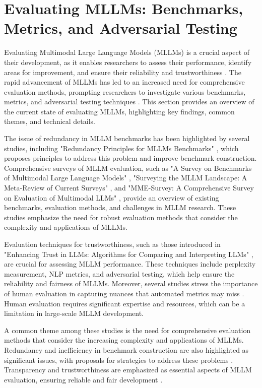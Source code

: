 \documentclass[conference]{IEEEtran}
\begin{document}
\section{Evaluating MLLMs: Benchmarks, Metrics, and Adversarial Testing}
Evaluating Multimodal Large Language Models (MLLMs) is a crucial aspect of their development, as it enables researchers to assess their performance, identify areas for improvement, and ensure their reliability and trustworthiness \cite{b1}. The rapid advancement of MLLMs has led to an increased need for comprehensive evaluation methods, prompting researchers to investigate various benchmarks, metrics, and adversarial testing techniques \cite{b2}. This section provides an overview of the current state of evaluating MLLMs, highlighting key findings, common themes, and technical details.

The issue of redundancy in MLLM benchmarks has been highlighted by several studies, including "Redundancy Principles for MLLMs Benchmarks" \cite{b3}, which proposes principles to address this problem and improve benchmark construction. Comprehensive surveys of MLLM evaluation, such as "A Survey on Benchmarks of Multimodal Large Language Models" \cite{b4}, "Surveying the MLLM Landscape: A Meta-Review of Current Surveys" \cite{b5}, and "MME-Survey: A Comprehensive Survey on Evaluation of Multimodal LLMs" \cite{b6}, provide an overview of existing benchmarks, evaluation methods, and challenges in MLLM research. These studies emphasize the need for robust evaluation methods that consider the complexity and applications of MLLMs.

Evaluation techniques for trustworthiness, such as those introduced in "Enhancing Trust in LLMs: Algorithms for Comparing and Interpreting LLMs" \cite{b7}, are crucial for assessing MLLM performance. These techniques include perplexity measurement, NLP metrics, and adversarial testing, which help ensure the reliability and fairness of MLLMs. Moreover, several studies stress the importance of human evaluation in capturing nuances that automated metrics may miss \cite{b8}. Human evaluation requires significant expertise and resources, which can be a limitation in large-scale MLLM development.

A common theme among these studies is the need for comprehensive evaluation methods that consider the increasing complexity and applications of MLLMs. Redundancy and inefficiency in benchmark construction are also highlighted as significant issues, with proposals for strategies to address these problems \cite{b3}. Transparency and trustworthiness are emphasized as essential aspects of MLLM evaluation, ensuring reliable and fair development \cite{b7}.
\end{document}

